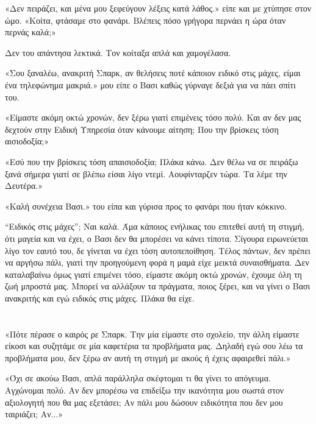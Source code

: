 \documentclass[12pt,twoside, openany]{book}
\begin{document}
«Δεν πειράζει, και μένα μου ξεφεύγουν λέξεις κατά λάθος.» είπε και με χτύπησε στον ώμο. «Κοίτα, φτάσαμε στο φανάρι. Βλέπεις πόσο γρήγορα περνάει η ώρα όταν περνάς καλά;»

Δεν του απάντησα λεκτικά. Τον κοίταξα απλά και χαμογέλασα.

«Σου ξαναλέω, ανακριτή Σπαρκ, αν θελήσεις ποτέ κάποιον ειδικό στις μάχες, είμαι ένα τηλεφώνημα μακριά.» μου είπε ο Βασι καθώς γύρναγε δεξιά για να πάει σπίτι του.

«Είμαστε ακόμη οκτώ χρονών, δεν ξέρω γιατί επιμένεις τόσο πολύ. Και αν δεν μας δεχτούν στην Ειδική Υπηρεσία όταν κάνουμε αίτηση; Που την βρίσκεις τόση αισιοδοξία;»

«Εσύ που την βρίσκεις τόση απαισιοδοξία; Πλάκα κάνω. Δεν θέλω να σε πειράξω ξανά σήμερα γιατί σε βλέπω είσαι λίγο ντεμί. Αουφίνταρζεν τώρα. Τα λέμε την Δευτέρα.»

«Καλή συνέχεια Βασι.» του είπα και γύρισα προς το φανάρι που ήταν κόκκινο. 

“Ειδικός στις μάχες”; Ναι καλά. Άμα κάποιος ενήλικας του επιτεθεί αυτή τη στιγμή, ότι μαγεία και να έχει, ο Βασι δεν θα μπορέσει να κάνει τίποτα. Σίγουρα ειρωνεύεται λίγο τον εαυτό του, δε γίνεται να έχει τόση αυτοπεποίθηση. Τέλος πάντων, δεν πρέπει να αργήσω πάλι, γιατί την προηγούμενη φορά η μαμά είχε μεικτά συναισθήματα. Δεν καταλαβαίνω όμως γιατί επιμένει τόσο, είμαστε ακόμη οκτώ χρονών, έχουμε όλη τη ζωή μπροστά μας. Μπορεί να αλλάξουν τα πράγματα, ποιος ξέρει, και να γίνει ο Βασι ανακριτής και εγώ ειδικός στις μάχες. Πλάκα θα είχε.

\chapter{}

«Πότε πέρασε ο καιρός ρε Σπαρκ. Την μία είμαστε στο σχολείο, την άλλη είμαστε είκοσι και συζητάμε σε μία καφετέρια τα προβλήματα μας. Δηλαδή εγώ σου λέω τα προβλήματα μου, δεν ξέρω αν αυτή τη στιγμή με   ακούς ή έχεις αφαιρεθεί πάλι.»

«Όχι σε ακούω Βασι, απλά παράλληλα σκέφτομαι τι θα γίνει το απόγευμα. Αγχώνομαι πολύ. Αν δεν μπορέσω να επιδείξω την ικανότητα μου σωστά στον αξιολογητή που θα μας εξετάσει; Αν πάλι μου δώσουν ειδικότητα που δεν μου ταιριάζει; Αν...»
\end{document}
